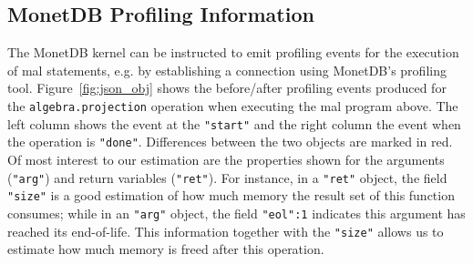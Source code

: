 \documentclass[conference]{IEEEtran}
\begin{document}
\subsection{MonetDB Profiling Information}

The MonetDB kernel can be instructed to emit profiling events for the execution of {\sc mal} statements, e.g. by establishing a connection using MonetDB's profiling tool.
Figure~\ref{fig:json_obj} shows the before/after profiling events produced for the \texttt{\small algebra.projection} operation when executing the {\sc mal} program above.
The left column shows the event at the \texttt{\small "start"} and the right column the event when the operation is \texttt{\small "done"}.
Differences between the two objects are marked in red.
Of most interest to our estimation are the properties shown for the arguments (\texttt{\small "arg"}) and return variables (\texttt{\small "ret"}).
For instance, in a \texttt{\small "ret"} object, the field \texttt{\small "size"} is a good estimation of how much memory the result set of this function consumes; while in an \texttt{\small "arg"} object, the field \texttt{\small "eol":1} indicates this argument has reached its end-of-life.
This information together with the \texttt{\small "size"} allows us to estimate how much memory is freed after this operation.

\end{document}

